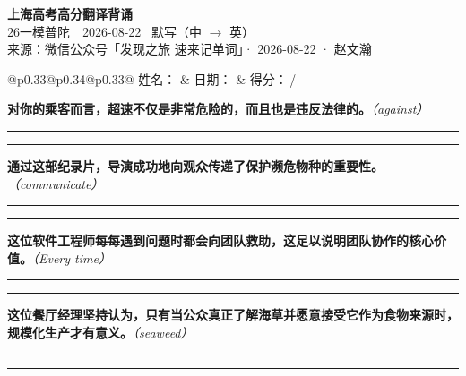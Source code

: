 \documentclass[11pt,a4paper]{article}
\newcommand{\num}[1]{\makebox[1.9em][r]{#1.}\hspace{0.3em}}
\newcommand{\wline}{\noindent\rule{\linewidth}{0.4pt}}
\newcommand{\prompt}[1]{\emph{\textcolor{tipblue}{\small（#1）}}}
\begin{document}
\pagestyle{plain}
\begin{center}
{\LARGE\bfseries 上海高考高分翻译背诵 }\\[0.25em]
{\large 26一模普陀　2026-08-22 \quad\ 默写（中 $\to$ 英）}\\[0.35em]
{\footnotesize 来源：微信公众号「发现之旅 速来记单词」· 2026-08-22 · 赵文瀚}
\end{center}

\vspace{0.4em}
\noindent\begin{tabular}{@{}p{0.33\textwidth}@{}p{0.34\textwidth}@{}p{0.33\textwidth}@{}}
姓名：\underline{\hspace{2.0cm}} & 日期：\underline{\hspace{2.0cm}} & 得分：\underline{\hspace{1.4cm}}\,/ \\
\end{tabular}

\vspace{0.5em}

\vspace{0.8em}
\num{1}\textbf{对你的乘客而言，超速不仅是非常危险的，而且也是违反法律的。}\prompt{against}

\vspace{0.3em}

\wline\vspace{0.3em}
\wline

\num{2}\textbf{通过这部纪录片，导演成功地向观众传递了保护濒危物种的重要性。}\prompt{communicate}

\vspace{0.3em}

\wline\vspace{0.3em}
\wline

\num{3}\textbf{这位软件工程师每每遇到问题时都会向团队救助，这足以说明团队协作的核心价值。}\prompt{Every time}

\vspace{0.3em}

\wline\vspace{0.3em}
\wline

\num{4}\textbf{这位餐厅经理坚持认为，只有当公众真正了解海草并愿意接受它作为食物来源时，规模化生产才有意义。}\prompt{seaweed}

\vspace{0.3em}

\wline\vspace{0.3em}
\wline
\end{document}
